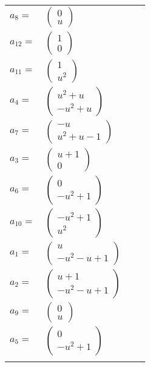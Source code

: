 \documentclass[1p]{elsarticle_modified}
\theoremstyle{definition}
\begin{document}
\begin{tabular}{m{7pt} m{180pt} m{7pt} m{180pt} }
\flushright $a_{8}=$&$\begin{pmatrix}0\\u\end{pmatrix}$ \\
\flushright $a_{12}=$&$\begin{pmatrix}1\\0\end{pmatrix}$ \\
\flushright $a_{11}=$&$\begin{pmatrix}1\\u^2\end{pmatrix}$ \\
\flushright $a_{4}=$&$\begin{pmatrix}u^2+u\\- u^2+u\end{pmatrix}$ \\
\flushright $a_{7}=$&$\begin{pmatrix}- u\\u^2+u-1\end{pmatrix}$ \\
\flushright $a_{3}=$&$\begin{pmatrix}u+1\\0\end{pmatrix}$ \\
\flushright $a_{6}=$&$\begin{pmatrix}0\\- u^2+1\end{pmatrix}$ \\
\flushright $a_{10}=$&$\begin{pmatrix}- u^2+1\\u^2\end{pmatrix}$ \\
\flushright $a_{1}=$&$\begin{pmatrix}u\\- u^2- u+1\end{pmatrix}$ \\
\flushright $a_{2}=$&$\begin{pmatrix}u+1\\- u^2- u+1\end{pmatrix}$ \\
\flushright $a_{9}=$&$\begin{pmatrix}0\\u\end{pmatrix}$ \\
\flushright $a_{5}=$&$\begin{pmatrix}0\\- u^2+1\end{pmatrix}$\\&\end{tabular}
\end{document}
